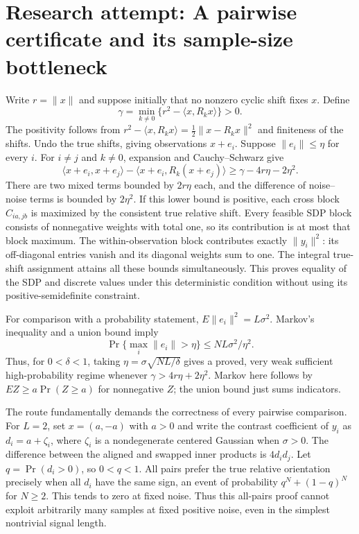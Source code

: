 \documentclass[11pt]{article}
\begin{document}
\section{Research attempt: A pairwise certificate and its sample-size bottleneck}
Write $r=\|x\|$ and suppose initially that no nonzero cyclic shift fixes $x$.
Define
\[
 \gamma=\min_{k\ne0}\{r^2-\langle x,R_kx\rangle\}>0.
\]
The positivity follows from
$r^2-\langle x,R_kx\rangle=\tfrac12\|x-R_kx\|^2$ and finiteness of the shifts.
Undo the true shifts, giving observations $x+e_i$. Suppose
$\|e_i\|\le\eta$ for every $i$. For $i\ne j$ and $k\ne0$, expansion and
Cauchy--Schwarz give
\[
 \langle x+e_i,x+e_j\rangle-
 \langle x+e_i,R_k(x+e_j)\rangle
 \ge\gamma-4r\eta-2\eta^2.
\]
There are two mixed terms bounded by $2r\eta$ each, and the difference of
noise--noise terms is bounded by $2\eta^2$. If this lower bound is positive,
each cross block $C_{ia,jb}$ is maximized by the consistent true relative shift.
Every feasible SDP block consists of nonnegative weights with total one, so its
contribution is at most that block maximum. The within-observation block
contributes exactly $\|y_i\|^2$: its off-diagonal entries vanish and its diagonal
weights sum to one. The integral true-shift assignment attains all these bounds
simultaneously. This proves equality of the SDP and discrete values under this
deterministic condition without using its positive-semidefinite constraint.

For comparison with a probability statement, $E\|e_i\|^2=L\sigma^2$.
Markov's inequality and a union bound imply
\[
 \Pr\{\max_i\|e_i\|>\eta\}\le NL\sigma^2/\eta^2.
\]
Thus, for $0<\delta<1$, taking $\eta=\sigma\sqrt{NL/\delta}$ gives a proved,
very weak sufficient high-probability regime whenever
$\gamma>4r\eta+2\eta^2$. Markov here follows by
$E Z\ge a\Pr(Z\ge a)$ for nonnegative $Z$; the union bound just sums indicators.

The route fundamentally demands the correctness of every pairwise comparison.
For $L=2$, set $x=(a,-a)$ with $a>0$ and write the contrast coefficient of
$y_i$ as $d_i=a+\zeta_i$, where $\zeta_i$ is a nondegenerate centered Gaussian
when $\sigma>0$. The difference between the aligned and swapped inner products
is $4d_id_j$. Let $q=\Pr(d_i>0)$, so $0<q<1$. All pairs prefer the true
relative orientation precisely when all $d_i$ have the same sign, an event of
probability $q^N+(1-q)^N$ for $N\ge2$. This tends to zero at fixed noise.
Thus this all-pairs proof cannot exploit arbitrarily many samples at fixed
positive noise, even in the simplest nontrivial signal length.
\end{document}
